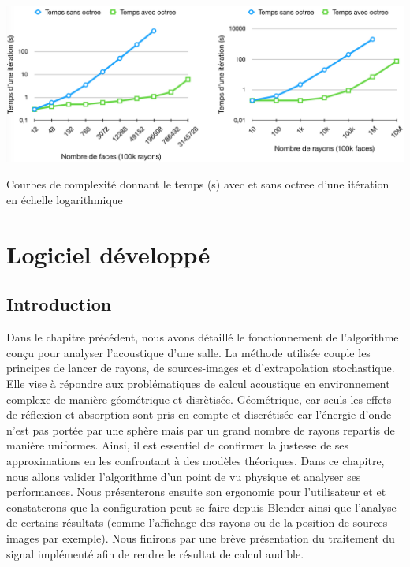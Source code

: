  \begin{figureth}
	\includegraphics[width=\linewidth]{images/complexiteBis}
	\caption{Courbes de complexité donnant le temps (s) avec et sans octree d'une itération en échelle logarithmique}
	\label{complexiteBis}
\end{figureth}









\chapter{Logiciel développé}
	\minitoc
	\newpage
	
\section{Introduction}

Dans le chapitre précédent, nous avons détaillé le fonctionnement de l'algorithme conçu pour analyser l'acoustique d'une salle. La méthode utilisée couple les principes de lancer de rayons, de sources-images et d'extrapolation stochastique. Elle vise à répondre aux problématiques de calcul acoustique en environnement complexe de manière géométrique et disrètisée. Géométrique, car seuls les effets de réflexion et absorption sont pris en compte et discrétisée car l'énergie d'onde n'est pas portée par une sphère mais par un grand nombre de rayons repartis de manière uniformes. Ainsi, il est essentiel de confirmer la justesse de ses approximations en les confrontant à des modèles théoriques. Dans ce chapitre, nous allons valider l'algorithme d'un point de vu physique et analyser ses performances. Nous présenterons ensuite son ergonomie pour l'utilisateur et et constaterons que la configuration peut se faire depuis Blender ainsi que l'analyse de certains résultats (comme l'affichage des rayons ou de la position de sources images par exemple). Nous finirons par une brève présentation du traitement du signal implémenté afin de rendre le résultat de calcul audible.


